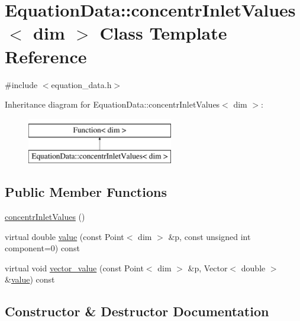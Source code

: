 \hypertarget{class_equation_data_1_1concentr_inlet_values}{}\section{Equation\+Data\+:\+:concentr\+Inlet\+Values$<$ dim $>$ Class Template Reference}
\label{class_equation_data_1_1concentr_inlet_values}


{\ttfamily \#include $<$equation\+\_\+data.\+h$>$}

Inheritance diagram for Equation\+Data\+:\+:concentr\+Inlet\+Values$<$ dim $>$\+:\begin{figure}[H]
\begin{center}
\leavevmode
\includegraphics[height=2.000000cm]{class_equation_data_1_1concentr_inlet_values}
\end{center}
\end{figure}
\subsection*{Public Member Functions}
\begin{DoxyCompactItemize}
\item 
\hyperlink{class_equation_data_1_1concentr_inlet_values_a8b12d233a24b1f06625b884c0a649004}{concentr\+Inlet\+Values} ()
\item 
virtual double \hyperlink{class_equation_data_1_1concentr_inlet_values_a819feb903b5bf6afe1aa0ab0f62d31a8}{value} (const Point$<$ dim $>$ \&p, const unsigned int component=0) const 
\item 
virtual void \hyperlink{class_equation_data_1_1concentr_inlet_values_a8b14d66851e8d02b563317ed20ff1a46}{vector\+\_\+value} (const Point$<$ dim $>$ \&p, Vector$<$ double $>$ \&\hyperlink{class_equation_data_1_1concentr_inlet_values_a819feb903b5bf6afe1aa0ab0f62d31a8}{value}) const 
\end{DoxyCompactItemize}


\subsection{Constructor \& Destructor Documentation}
\hypertarget{class_equation_data_1_1concentr_inlet_values_a8b12d233a24b1f06625b884c0a649004}{}
